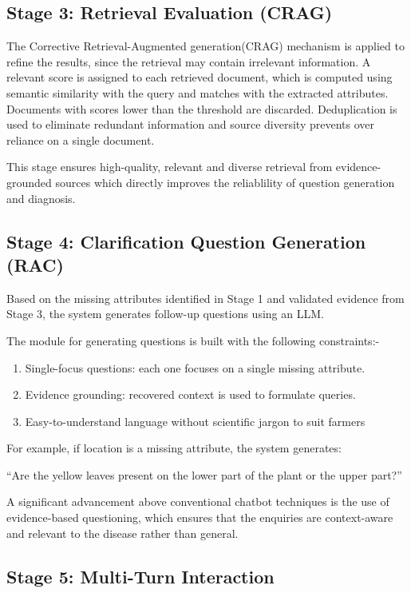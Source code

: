 \documentclass[conference]{IEEEtran}
\begin{document}
\subsection{Stage 3: Retrieval Evaluation (CRAG)}

The Corrective Retrieval-Augmented generation(CRAG) mechanism is applied to refine the results, since the retrieval may contain irrelevant information. A relevant score is assigned to each retrieved document, which is computed using semantic similarity with the query and matches with the extracted attributes. Documents with scores lower than the threshold are discarded. Deduplication is used to eliminate redundant information and source diversity prevents over reliance on a single document. 

This stage ensures high-quality, relevant and diverse retrieval from evidence-grounded sources which directly improves the reliablility of question generation and diagnosis.

\subsection{Stage 4: Clarification Question Generation (RAC)}

Based on the missing attributes identified in Stage 1 and validated evidence from Stage 3, the system generates follow-up questions using an LLM.

The module for generating questions is built with the following constraints:-

\begin{enumerate}
    \item Single-focus questions: each one focuses on a single missing attribute.
    \item Evidence grounding: recovered context is used to formulate queries.
    \item Easy-to-understand language without scientific jargon to suit farmers
\end{enumerate}
For example, if location is a missing attribute, the system generates:

“Are the yellow leaves present on the lower part of the plant or the upper part?”

A significant advancement above conventional chatbot techniques is the use of evidence-based questioning, which ensures that the enquiries are context-aware and relevant to the disease rather than general.

\subsection{Stage 5: Multi-Turn Interaction}
\end{document}
